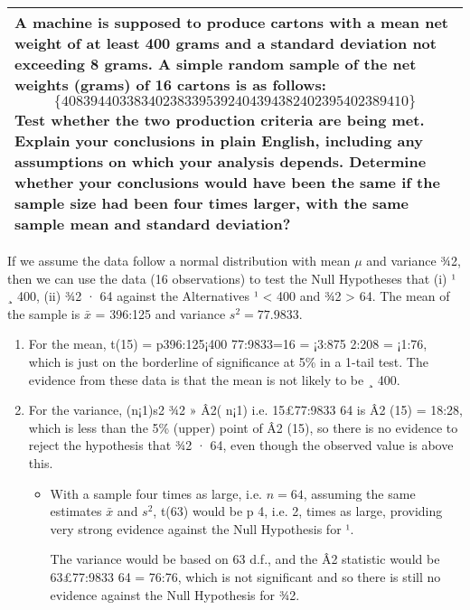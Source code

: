 \documentclass[a4paper,12pt]{article}
\begin{document}
\begin{table}[ht!]
     
\centering
     
\begin{tabular}{|p{15cm}|}
     
\hline 
A machine is supposed to produce cartons with a mean net weight of at least 400 grams and
a standard deviation not exceeding 8 grams. A simple random sample of the net weights
(grams) of 16 cartons is as follows:
\[\{408 394 403 383 402 383 395 392 404 394 382 402 395 402 389 410\}\]
Test whether the two production criteria are being met. Explain your conclusions in plain
English, including any assumptions on which your analysis depends. Determine whether
your conclusions would have been the same if the sample size had been four times larger,
with the same sample mean and standard deviation?
\\ \hline
      
\end{tabular}
    
\end{table}


If we assume the data follow a normal distribution with mean $\mu$ and variance ¾2,
then we can use the data (16 observations) to test the Null Hypotheses that
(i) ¹ ¸ 400, (ii) ¾2 · 64 against the Alternatives ¹ < 400 and ¾2 > 64.
The mean of the sample is $\bar{x}$ = 396:125 and variance $s^2 = 77.9833$.


\begin{enumerate}
    \item For the mean, t(15) = p396:125¡400
77:9833=16
= ¡3:875
2:208 = ¡1:76, which is just on the
borderline of significance at 5\% in a 1-tail test. The evidence from these
data is that the mean is not likely to be ¸ 400.
\item For the variance, (n¡1)s2
¾2 » Â2(
n¡1) i.e. 15£77:9833
64 is Â2
(15) = 18:28, which is
less than the 5\% (upper) point of Â2
(15), so there is no evidence to reject the
hypothesis that ¾2 · 64, even though the observed value is above this.
\begin{itemize}
\item With a sample four times as large, i.e. $n = 64$, assuming the same estimates
$\bar{x}$ and $s^2$, t(63) would be
p
4, i.e. 2, times as large, providing very strong
evidence against the Null Hypothesis for ¹. 

The variance would be based
on 63 d.f., and the Â2 statistic would be 63£77:9833
64 = 76:76, which is not
significant and so there is still no evidence against the Null Hypothesis for
¾2.
\end{itemize}
\end{enumerate}
\end{document}
